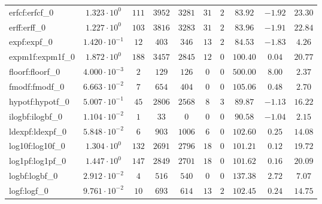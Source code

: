 \begin{tabular}{|l|c|c|c|c|c|c|c|c|c|}
erfcf:erfcf\_0               & $ 1.323 \cdot 10^{0}  $ & $ 111    $ & $ 3952  $ & $ 3281  $ & $ 31  $ & $ 2  $ & $ 83.92       $ & $ -1.92   $ & $ 23.30   $ \\
erff:erff\_0                 & $ 1.227 \cdot 10^{0}  $ & $ 103    $ & $ 3816  $ & $ 3283  $ & $ 31  $ & $ 2  $ & $ 83.96       $ & $ -1.91   $ & $ 22.84   $ \\
expf:expf\_0                 & $ 1.420 \cdot 10^{-1} $ & $ 12     $ & $ 403   $ & $ 346   $ & $ 13  $ & $ 2  $ & $ 84.53       $ & $ -1.83   $ & $ 4.26    $ \\
expm1f:expm1f\_0             & $ 1.872 \cdot 10^{0}  $ & $ 188    $ & $ 3457  $ & $ 2845  $ & $ 12  $ & $ 0  $ & $ 100.40      $ & $ 0.04    $ & $ 20.77   $ \\
floorf:floorf\_0             & $ 4.000 \cdot 10^{-3} $ & $ 2      $ & $ 129   $ & $ 126   $ & $ 0   $ & $ 0  $ & $ 500.00      $ & $ 8.00    $ & $ 2.37    $ \\
fmodf:fmodf\_0               & $ 6.663 \cdot 10^{-2} $ & $ 7      $ & $ 654   $ & $ 404   $ & $ 0   $ & $ 0  $ & $ 105.06      $ & $ 0.48    $ & $ 2.70    $ \\
hypotf:hypotf\_0             & $ 5.007 \cdot 10^{-1} $ & $ 45     $ & $ 2806  $ & $ 2568  $ & $ 8   $ & $ 3  $ & $ 89.87       $ & $ -1.13   $ & $ 16.22   $ \\
ilogbf:ilogbf\_0             & $ 1.104 \cdot 10^{-2} $ & $ 1      $ & $ 33    $ & $ 0     $ & $ 0   $ & $ 0  $ & $ 90.58       $ & $ -1.04   $ & $ 2.15    $ \\
ldexpf:ldexpf\_0             & $ 5.848 \cdot 10^{-2} $ & $ 6      $ & $ 903   $ & $ 1006  $ & $ 6   $ & $ 0  $ & $ 102.60      $ & $ 0.25    $ & $ 14.08   $ \\
log10f:log10f\_0             & $ 1.304 \cdot 10^{0}  $ & $ 132    $ & $ 2691  $ & $ 2796  $ & $ 18  $ & $ 0  $ & $ 101.21      $ & $ 0.12    $ & $ 19.72   $ \\
log1pf:log1pf\_0             & $ 1.447 \cdot 10^{0}  $ & $ 147    $ & $ 2849  $ & $ 2701  $ & $ 18  $ & $ 0  $ & $ 101.62      $ & $ 0.16    $ & $ 20.09   $ \\
logbf:logbf\_0               & $ 2.912 \cdot 10^{-2} $ & $ 4      $ & $ 516   $ & $ 540   $ & $ 0   $ & $ 0  $ & $ 137.38      $ & $ 2.72    $ & $ 7.07    $ \\
logf:logf\_0                 & $ 9.761 \cdot 10^{-2} $ & $ 10     $ & $ 693   $ & $ 614   $ & $ 13  $ & $ 2  $ & $ 102.45      $ & $ 0.24    $ & $ 14.75   $ \\

\end{tabular}
